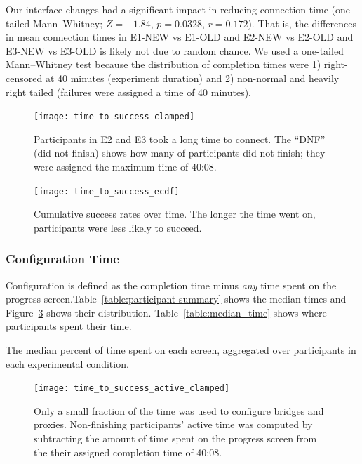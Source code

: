 \documentclass[USenglish,oneside,twocolumn]{article}
\begin{document}
Our interface changes had a significant impact in reducing connection time (one-tailed Mann--Whitney; $ Z = -1.84$, $p = 0.0328$, $r= 0.172$). That is, the differences in mean connection times in E1-NEW vs E1-OLD and E2-NEW vs E2-OLD and E3-NEW vs E3-OLD is likely not due to random chance. We used a one-tailed Mann--Whitney test because the distribution of completion times were 1) right-censored at 40 minutes (experiment duration) and 2) non-normal and heavily right tailed (failures were assigned a time of 40 minutes). 

\begin{figure}[t]
\centering
\texttt{[image: time\_to\_success\_clamped]}
\caption{
Participants in E2 and E3 took a long time to connect.
The ``DNF'' (did not finish) shows how many of participants 
did not finish; they were assigned the maximum time of 40:08.}
\label{fig:time_to_success_clamped}
\end{figure}

\begin{figure}[t]
\centering
\texttt{[image: time\_to\_success\_ecdf]}
%
\caption{
Cumulative success rates over time. The longer the time went on, participants were less likely to succeed. 
}
\label{fig:time_to_success_ecdf}
\end{figure}


\subsubsection{Configuration Time} 
Configuration is defined as the completion time minus {\it any} time spent on the progress screen.Table~\ref{table:participant-summary} shows the median times and Figure~\ref{fig:time_to_success_active_clamped} shows their distribution. Table~\ref{table:median_time} shows where participants spent their time.  

\begin{table}[t]
\centering

\caption{
The median percent of time spent on each screen, aggregated over participants in each experimental condition. }
\label{table:median_time}
\end{table}

\begin{figure}[t]
\centering
\texttt{[image: time\_to\_success\_active\_clamped]}
\caption{
Only a small fraction of the time was used to configure bridges and proxies.
Non-finishing participants' active time was computed by
subtracting the amount of time spent on the progress screen from the 
their assigned completion time of 40:08.
}
\label{fig:time_to_success_active_clamped}
\end{figure}
\end{document}
